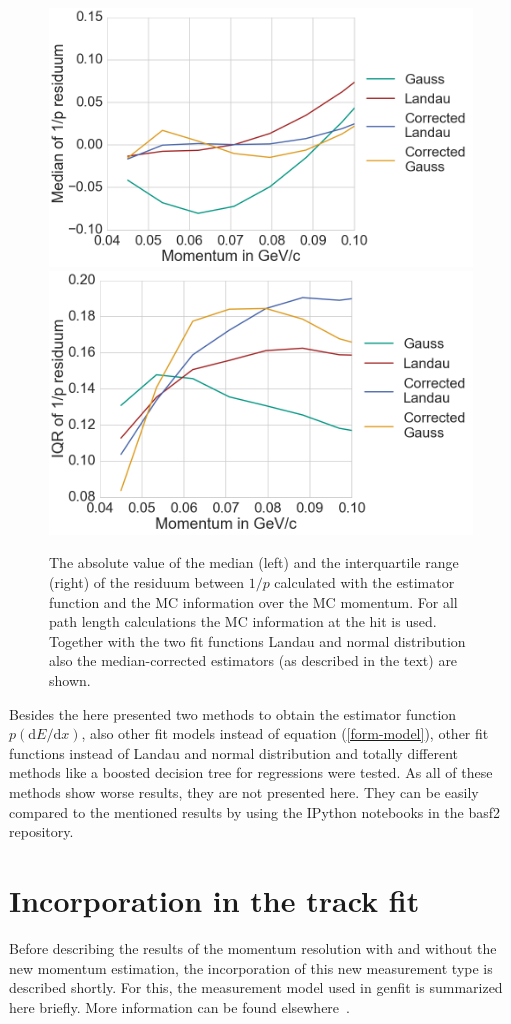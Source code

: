 \begin{figure}
  \centering
   \includegraphics[width=0.48\linewidth]{figures/vxd/divPMedian.png}
   \includegraphics[width=0.48\linewidth]{figures/vxd/divPIQR.png}
  \caption[Median and IQR of $1/p$.]{The absolute value of the median (left) and the interquartile range (right) of the residuum between $1/p$ calculated with the estimator function and the MC information over the MC momentum. For all path length calculations the MC information at the hit is used. Together with the two fit functions Landau and normal distribution also the median-corrected estimators (as described in the text) are shown.}
  \label{fig-divp-residuum}
\end{figure}


Besides the here presented two methods to obtain the estimator function $p(\mathrm dE/\mathrm dx)$, also other fit models instead of equation (\ref{form-model}), other fit functions instead of Landau and normal distribution and totally different methods like a boosted decision tree for regressions were tested. As all of these methods show worse results, they are not presented here. They can be easily compared to the mentioned results by using the IPython notebooks in the basf2 repository.

\section{Incorporation in the track fit}

Before describing the results of the momentum resolution with and without the new momentum estimation, the incorporation of this new measurement type is described shortly. For this, the measurement model used in genfit is summarized here briefly. More information can be found elsewhere~\cite{genfit}.

